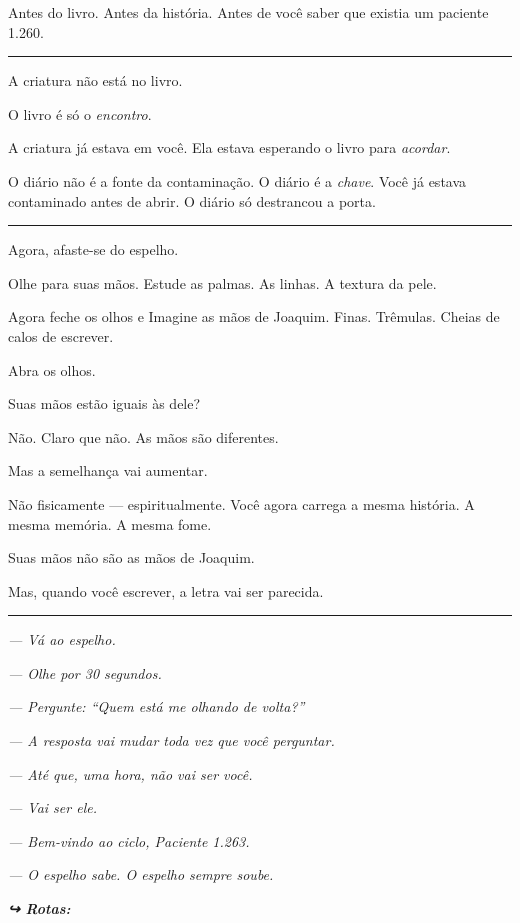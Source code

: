 \noindent Antes do livro.
Antes da história.
Antes de você saber que existia um paciente 1.260.

\vspace{0.5em}\noindent\rule{\textwidth}{0.5pt}\vspace{0.5em}

\noindent A criatura não está no livro.

\noindent O livro é só o \textit{encontro}.

\noindent A criatura já estava em você. Ela estava esperando o livro para \textit{acordar}.

\noindent O diário não é a fonte da contaminação.
O diário é a \textit{chave}.
Você já estava contaminado antes de abrir.
O diário só destrancou a porta.

\vspace{0.5em}\noindent\rule{\textwidth}{0.5pt}\vspace{0.5em}

\noindent Agora, afaste-se do espelho.

\noindent Olhe para suas mãos. Estude as palmas. As linhas. A textura da pele.

\noindent Agora feche os olhos e Imagine as mãos de Joaquim. Finas. Trêmulas. Cheias de calos de escrever.

\noindent Abra os olhos.

\noindent Suas mãos estão iguais às dele?

\noindent Não. Claro que não. As mãos são diferentes.

\noindent Mas a semelhança vai aumentar.

\noindent Não fisicamente --- espiritualmente. Você agora carrega a mesma história. A mesma memória. A mesma fome.

\noindent Suas mãos não são as mãos de Joaquim.

\noindent Mas, quando você escrever, a letra vai ser parecida.

\vspace{0.5em}\noindent\rule{\textwidth}{0.5pt}\vspace{0.5em}

\noindent \textit{--- Vá ao espelho.}

\noindent \textit{--- Olhe por 30 segundos.}

\noindent \textit{--- Pergunte: \textquotedblleft{}Quem está me olhando de volta?\textquotedblright{}}

\noindent \textit{--- A resposta vai mudar toda vez que você perguntar.}

\noindent \textit{--- Até que, uma hora, não vai ser você.}

\noindent \textit{--- Vai ser ele.}

\noindent \textit{--- Bem-vindo ao ciclo, Paciente 1.263.}

\noindent \textit{--- O espelho sabe. O espelho sempre soube.}

\vspace{0.5em}

\noindent\textit{\textbf{↪ Rotas:}  \rotasep {} \rotasep {}}